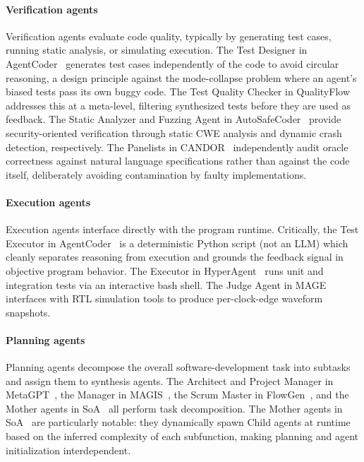 \documentclass{llmxive}
\begin{document}
\paragraph{Verification agents} Verification agents evaluate code
quality, typically by generating test cases, running static
analysis, or simulating execution. The Test Designer in
AgentCoder~\cite{huang2023agentcoder} generates test cases
independently of the code to avoid circular reasoning, a design
principle against the mode-collapse problem where an agent's
biased tests pass its own buggy code. The Test Quality Checker in
QualityFlow~\cite{Hu2025QualityFlow} addresses this at a
meta-level, filtering synthesized tests before they are used as
feedback. The Static Analyzer and Fuzzing Agent in
AutoSafeCoder~\cite{Nunez2024AutoSafeCoder} provide
security-oriented verification through static CWE analysis and
dynamic crash detection, respectively. The Panelists in
CANDOR~\cite{Xu2025Hallucination} independently audit oracle
correctness against natural language specifications rather than
against the code itself, deliberately avoiding contamination by
faulty implementations.

\paragraph{Execution agents} Execution agents interface directly
with the program runtime. Critically, the Test Executor in
AgentCoder~\cite{huang2023agentcoder} is a deterministic Python
script (not an LLM) which cleanly separates reasoning from
execution and grounds the feedback signal in objective program
behavior. The Executor in HyperAgent~\cite{Phan2024HyperAgent}
runs unit and integration tests via an interactive bash shell.
The Judge Agent in MAGE~\cite{Zhao2024MAGE} interfaces with RTL
simulation tools to produce per-clock-edge waveform snapshots.

\paragraph{Planning agents} Planning agents decompose the overall
software-development task into subtasks and assign them to
synthesis agents. The Architect and Project Manager in
MetaGPT~\cite{Hong2023MetaGPT}, the Manager in
MAGIS~\cite{Tao2024Magis}, the Scrum Master in
FlowGen~\cite{Lin2025Soen101}, and the Mother agents in
SoA~\cite{Ishibashi2024SelfOrganized} all perform task
decomposition. The Mother agents in
SoA~\cite{Ishibashi2024SelfOrganized} are particularly notable:
they dynamically spawn Child agents at runtime based on the
inferred complexity of each subfunction, making planning and
agent initialization interdependent.
\end{document}
